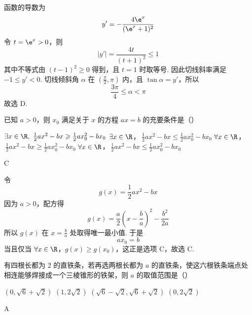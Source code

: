 \begin{solution}
函数的导数为
\[
y'=-\frac{4\e^{x}}{(\e^{x}+1)^{2}}
\]
令 \(t=\e^{x}>0\)，则
\[
|y'|=\frac{4t}{(t+1)^{2}}\leqslant1
\]
其中不等式由 \((t-1)^{2}\geqslant0\) 得到，且 \(t=1\) 时取等号. 因此切线斜率满足 \(-1\leqslant y'<0\). 切线倾斜角 \(\alpha\) 在 \((\frac{\pi}{2},\pi)\) 内，且 \(\tan\alpha=y'\)，所以
\[
\frac{3\pi}{4}\leqslant\alpha<\pi
\]
故选 D.
\end{solution}

\begin{problem}
已知 \(a > 0\)，则 \(x_0\) 满足关于 \(x\) 的方程 \(ax = b\) 的充要条件是（\quad）

\choices
    {\(\exists x \in \R,\ \frac{1}{2}ax^{2} - bx \geqslant \frac{1}{2}ax_{0}^{2} - bx_{0}\)}
    {\(\exists x \in \R\)，\(\ \frac{1}{2}ax^{2} - bx \leqslant \frac{1}{2}ax_{0}^{2} - bx_{0}\)}
    {\(\forall x \in \R\)，\(\ \frac{1}{2}ax^{2} - bx \geqslant \frac{1}{2}ax_{0}^{2} - bx_{0}\)}
    {\(\forall x \in \R\)，\(\ \frac{1}{2}ax^{2} - bx \leqslant \frac{1}{2}ax_{0}^{2} - bx_{0}\)}
\end{problem}

\begin{answer}
C
\end{answer}

\begin{solution}
令
\[
g(x)=\frac{1}{2}ax^{2}-bx
\]
因为 \(a>0\)，配方得
\[
g(x)=\frac{a}{2}\left(x-\frac{b}{a}\right)^{2}-\frac{b^{2}}{2a}
\]
所以 \(g(x)\) 在 \(x=\frac{b}{a}\) 处取得唯一最小值. 于是
\[
ax_{0}=b
\]
当且仅当 \(\forall x\in\R\)，\(g(x)\geqslant g(x_{0})\)，这正是选项 C，故选 C.
\end{solution}

\begin{problem}
有四根长都为 2 的直铁条，若再选两根长都为 \(a\) 的直铁条，使这六根铁条端点处相连能够焊接成一个三棱锥形的铁架，则 \(a\) 的取值范围是（\quad）

\choices
    {\((0, \sqrt{6} + \sqrt{2})\)}
    {\((1, 2\sqrt{2})\)}
    {\((\sqrt{6} -\sqrt{2},\sqrt{6} +\sqrt{2})\)}
    {\((0,2\sqrt{2})\)}
\end{problem}

\begin{answer}
A
\end{answer}

